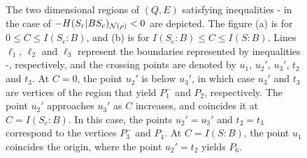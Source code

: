 \documentclass[journal]{IEEEtran}
\begin{document}
\begin{lmm}
\begin{lmm}
\begin{figure}[h]
{
}
\caption{
The two dimensional regions of $(Q,E)$ satisfying inequalities - in the case of $-H(S_r|BS_c)_{{\mathcal N}(\rho)}<0$ are depicted.
The figure (a) is for $0\leq C\leq I(S_c\!:\!B)$, and (b) is for $I(S_c\!:\!B)\leq C\leq I(S\!:\!B)$.
Lines $\ell_1$, $\ell_2$ and $\ell_3$ represent the boundaries represented by inequalities -, respectively, and the crossing points are denoted by $u_1$,  $u_2'$, $u_3'$, $t_2$ and $t_3$.
At $C=0$, the point $u_2'$ is below $u_3'$,
in which case $u_3'$ and $t_3$ are vertices of the region that yield $P_1^-$ and $P_2$, respectively.
The point $u_2'$ approaches $u_3'$ as $C$ increases, and coincides it at $C=I(S_c:B)$.
In this case, the points $u_2'=u_3'$ and $t_2=t_3$ correspond to the vertices $P_3^-$ and $P_4$.
At $C=I(S:B)$,  the point $u_1$ coincides the origin, where the point $u_2'=t_2$ yields $P_6$.
}
\label{fig:rateregion2}
\end{figure}




\end{lmm}
\end{lmm}
\end{document}
